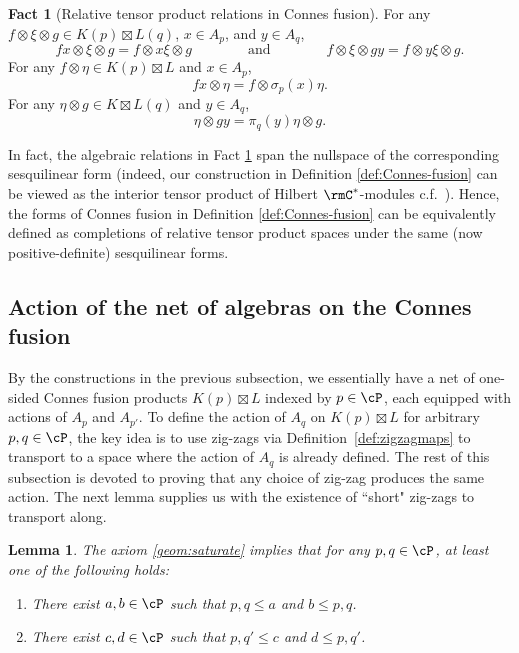 \documentclass[11pt,reqno]{amsart}
\numberwithin{equation}{section}
\theoremstyle{plain}
\newtheorem{lemma}[equation]{Lemma}
\theoremstyle{definition}
\newtheorem{fact}[equation]{Fact}
\begin{document}
\begin{fact}[Relative tensor product relations in Connes fusion]\label{fact:relative-tensor-relations}
    For any $f\otimes\xi\otimes g\in K(p)\boxtimes L(q)$, $x\in A_p$, and $y\in A_q$,
    \[
    fx\otimes \xi\otimes g=f\otimes x\xi\otimes g
    \qquad\qquad
    \text{and}
    \qquad\qquad
    f\otimes\xi\otimes gy=f\otimes y\xi\otimes g.
    \]
    For any $f\otimes\eta\in K(p)\boxtimes L$ and $x\in A_p$,
    \[
    fx\otimes\eta=f\otimes \sigma_p(x)\eta.
    \]
    For any $\eta\otimes g\in K\boxtimes L(q)$ and $y\in A_q$,
    \[
    \eta\otimes gy=\pi_q(y)\eta\otimes g.
    \]
\end{fact}
In fact, the algebraic relations in Fact \ref{fact:relative-tensor-relations} span the nullspace of the corresponding sesquilinear form (indeed, our construction in Definition \ref{def:Connes-fusion} can be viewed as the interior tensor product of Hilbert $\rmC^*$-modules c.f.~\cite[Prop.~4.5]{MR1325694}). 
Hence, the forms of Connes fusion in Definition \ref{def:Connes-fusion} can be equivalently defined as completions of relative tensor product spaces under the same (now positive-definite) sesquilinear forms.

\subsection{Action of the net of algebras on the Connes fusion}

By the constructions in the previous subsection, we essentially have a net of one-sided Connes fusion products $K(p)\boxtimes L$ indexed by $p\in\cP$, each equipped with actions of $A_p$ and $A_{p'}$. To define the action of $A_q$ on $K(p)\boxtimes L$ for arbitrary $p,q\in\cP$, the key idea is to use zig-zags via Definition~\ref{def:zigzagmaps} to transport to a space where the action of $A_q$ is already defined. The rest of this subsection is devoted to proving that any choice of zig-zag produces the same action. The next lemma supplies us with the existence of ``short" zig-zags to transport along.

\begin{lemma}\label{lemma:saturation-diagonal-pair}
    The axiom \ref{geom:saturate} implies that for any $p,q\in{\cP}$, at least one of the following holds:
    \begin{enumerate}
        \item There exist $a,b\in{\cP}$ such that $p,q\leq a$ and $b\leq p,q$.
        \item There exist $c,d\in{\cP}$ such that $p,q'\leq c$ and $d\leq p,q'$.
    \end{enumerate}
\end{lemma}
\end{document}
